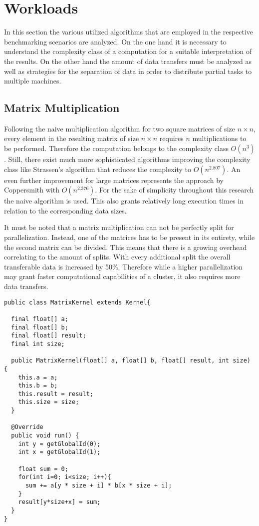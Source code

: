 \section{Workloads}
\label{workload_explanation}
In this section the various utilized algorithms that are employed in the respective benchmarking scenarios are analyzed. On the one hand it is necessary to understand the complexity class of a computation for a suitable interpretation of the results. On the other hand the amount of data transfers must be analyzed as well as strategies for the separation of data in order to distribute partial tasks to multiple machines.

\subsection*{Matrix Multiplication}
\label{matrix_multiplication_workload}
Following the naive multiplication algorithm for two square matrices of size $n\times n$, every element in the resulting matrix of size $n\times n$ requires $n$ multiplications to be performed. Therefore the computation belongs to the complexity class $O(n^3)$. Still, there exist much more sophisticated algorithms improving the complexity class like Strassen's algorithm that reduces the complexity to $O(n^{2.807})$\cite{strassen}. An even further improvement for large matrices represents the approach by Coppersmith with $O(n^{2.376})$\cite{coppersmith}. For the sake of simplicity throughout this research the naive algorithm is used. This also grants relatively long execution times in relation to the corresponding data sizes.

It must be noted that a matrix multiplication can not be perfectly split for parallelization. Instead, one of the matrices has to be present in its entirety, while the second matrix can be divided. This means that there is a growing overhead correlating to the amount of splits. With every additional split the overall transferable data is increased by 50\%. Therefore while a higher parallelization may grant faster computational capabilities of a cluster, it also requires more data transfers.

\begin{lstlisting}[caption=Aparapi Matrix Multiplication,captionpos=b,label=lst:aparapi_matrix_multiplication]
public class MatrixKernel extends Kernel{

  final float[] a;
  final float[] b;
  final float[] result;
  final int size;

  public MatrixKernel(float[] a, float[] b, float[] result, int size) {
    this.a = a;
    this.b = b;
    this.result = result;
    this.size = size;
  }

  @Override
  public void run() {
    int y = getGlobalId(0);
    int x = getGlobalId(1);

    float sum = 0;
    for(int i=0; i<size; i++){
      sum += a[y * size + i] * b[x * size + i];
    }
    result[y*size+x] = sum;
  }
}
\end{lstlisting}

